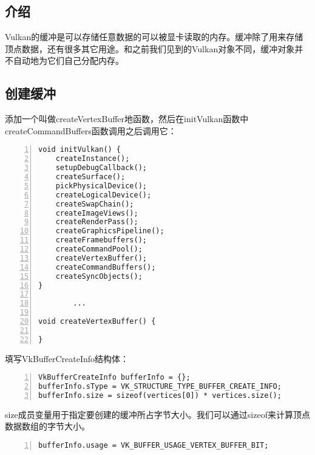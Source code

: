 \documentclass{ctexart}
\begin{document}
\subsection{介绍}

Vulkan的缓冲是可以存储任意数据的可以被显卡读取的内存。缓冲除了用来存储顶点数据，还有很多其它用途。和之前我们见到的Vulkan对象不同，缓冲对象并不自动地为它们自己分配内存。

\subsection{创建缓冲}

添加一个叫做createVertexBuffer地函数，然后在initVulkan函数中createCommandBuffers函数调用之后调用它：

\begin{lstlisting}[language={[ANSI]C},keywordstyle=\color{blue!70},commentstyle=\color{red!50!green!50!blue!50},frame=shadowbox, rulesepcolor=\color{red!20!green!20!blue!20},basicstyle=\small,numbers=left, numberstyle=\tiny,breaklines=true]
void initVulkan() {
	createInstance();
	setupDebugCallback();
	createSurface();
	pickPhysicalDevice();
	createLogicalDevice();
	createSwapChain();
	createImageViews();
	createRenderPass();
	createGraphicsPipeline();
	createFramebuffers();
	createCommandPool();
	createVertexBuffer();
	createCommandBuffers();
	createSyncObjects();
}

		...

void createVertexBuffer() {

}
\end{lstlisting}

填写VkBufferCreateInfo结构体：

\begin{lstlisting}[language={[ANSI]C},keywordstyle=\color{blue!70},commentstyle=\color{red!50!green!50!blue!50},frame=shadowbox, rulesepcolor=\color{red!20!green!20!blue!20},basicstyle=\small,numbers=left, numberstyle=\tiny,breaklines=true]
VkBufferCreateInfo bufferInfo = {};
bufferInfo.sType = VK_STRUCTURE_TYPE_BUFFER_CREATE_INFO;
bufferInfo.size = sizeof(vertices[0]) * vertices.size();
\end{lstlisting}

size成员变量用于指定要创建的缓冲所占字节大小。我们可以通过sizeof来计算顶点数据数组的字节大小。

\begin{lstlisting}[language={[ANSI]C},keywordstyle=\color{blue!70},commentstyle=\color{red!50!green!50!blue!50},frame=shadowbox, rulesepcolor=\color{red!20!green!20!blue!20},basicstyle=\small,numbers=left, numberstyle=\tiny,breaklines=true]
bufferInfo.usage = VK_BUFFER_USAGE_VERTEX_BUFFER_BIT;
\end{lstlisting}
\end{document}
